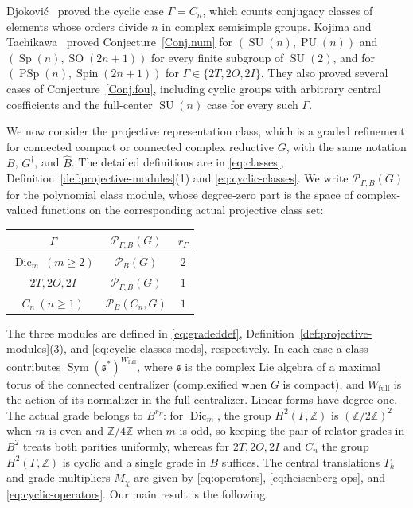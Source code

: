\documentclass[11pt,a4paper,reqno]{amsart}
\theoremstyle{plain}
\theoremstyle{definition}
\theoremstyle{remark}
\numberwithin{equation}{section}
\DeclareMathOperator{\Sym}{Sym}
\DeclareMathOperator{\SO}{SO}
\newcommand{\SU}{\operatorname{SU}}
\newcommand{\ZZ}{\mathbb Z}
\newcommand{\cP}{\mathcal P}
\newcommand{\wtP}{\widetilde{\mathcal P}}
\newcommand{\Dic}{\operatorname{Dic}}
\begin{document}
Djokovi\'c~\cite[Theorem~1]{djokovic} proved the cyclic case $\Gamma=C_n$, which counts conjugacy classes of elements whose orders divide $n$ in complex semisimple groups. Kojima and Tachikawa~\cite{kojima-tachikawa} proved Conjecture~\ref{Conj.num} for $(\SU(n),\operatorname{PU}(n))$ and $(\operatorname{Sp}(n),\SO(2n+1))$ for every finite subgroup of $\SU(2)$, and for $(\operatorname{PSp}(n),\operatorname{Spin}(2n+1))$ for $\Gamma\in\{2T,2O,2I\}$. They also proved several cases of Conjecture~\ref{Conj.fou}, including cyclic groups with arbitrary central coefficients and the full-center $\SU(n)$ case for every such $\Gamma$.

We now consider the projective representation class, which is a graded refinement for connected compact or connected complex reductive $G$, with the same notation $B$, $G^\dagger$, and $\widehat B$. The detailed definitions are in \eqref{eq:classes}, Definition~\ref{def:projective-modules}(1) and \eqref{eq:cyclic-classes}. We write $\mathscr P_{\Gamma,B}(G)$ for the polynomial class module, whose degree-zero part is the space of complex-valued functions on the corresponding actual projective class set:
\begin{center}
\begin{tabular}{ccc}
\toprule
$\Gamma$ & $\mathscr P_{\Gamma,B}(G)$ & $r_\Gamma$\\
\midrule
$\Dic_m\ (m\ge2)$ & $\cP_B(G)$ & $2$\\
$2T,2O,2I$ & $\wtP_{\Gamma,B}(G)$ & $1$\\
$C_n\ (n\ge1)$ & $\cP_B(C_n,G)$ & $1$\\
\bottomrule
\end{tabular}
\end{center}
The three modules are defined in \eqref{eq:gradeddef}, Definition~\ref{def:projective-modules}(3), and \eqref{eq:cyclic-classes-mods}, respectively. In each case a class contributes $\Sym(\mathfrak s^*)^{W_{\mathrm{full}}}$, where $\mathfrak s$ is the complex Lie algebra of a maximal torus of the connected centralizer (complexified when $G$ is compact), and $W_{\mathrm{full}}$ is the action of its normalizer in the full centralizer. Linear forms have degree one. The actual grade belongs to $B^{r_\Gamma}$: for $\Dic_m$, the group $H^2(\Gamma,\ZZ)$ is $(\ZZ/2\ZZ)^2$ when $m$ is even and $\ZZ/4\ZZ$ when $m$ is odd, so keeping the pair of relator grades in $B^2$ treats both parities uniformly, whereas for $2T,2O,2I$ and $C_n$ the group $H^2(\Gamma,\ZZ)$ is cyclic and a single grade in $B$ suffices. The central translations $T_k$ and grade multipliers $M_\chi$ are given by \eqref{eq:operators}, \eqref{eq:heisenberg-ops}, and \eqref{eq:cyclic-operators}. Our main result is the following.
\end{document}
